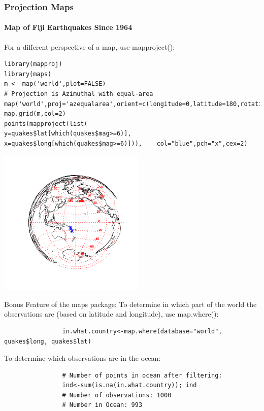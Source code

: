 \begin{frame}
\frametitle{Projection Maps}
  \framesubtitle{Map of Fiji Earthquakes Since 1964}

For a different perspective of a map, use  \ttfamily mapproject(): \normalfont 

\begin{lstlisting}
library(mapproj)
library(maps)
m <- map('world',plot=FALSE)
# Projection is Azimuthal with equal-area
map('world',proj='azequalarea',orient=c(longitude=0,latitude=180,rotation=0))
map.grid(m,col=2)
points(mapproject(list(                       y=quakes$lat[which(quakes$mag>=6)],       x=quakes$long[which(quakes$mag>=6)])),    col="blue",pch="x",cex=2)
\end{lstlisting}

\newpage
       \begin{center}
\includegraphics[width = 70mm]{images/Fuji2.pdf}
\end{center}

\end{frame}

\begin{frame}[fragile]
	\begin{alertblock}{Bonus Feature of the \ttfamily maps \normalfont package:}
		To determine in which part of the world the observations are (based on latitude and longitude), use \ttfamily map.where(): \normalfont
			\begin{lstlisting}		
				in.what.country<-map.where(database="world", quakes$long, quakes$lat)
			\end{lstlisting}
		To determine which observations are in the ocean: \normalfont
			\begin{lstlisting}
				# Number of points in ocean after filtering:
				ind<-sum(is.na(in.what.country)); ind
				# Number of observations: 1000
				# Number in Ocean: 993
			\end{lstlisting}
	\end{alertblock}

\end{frame}

